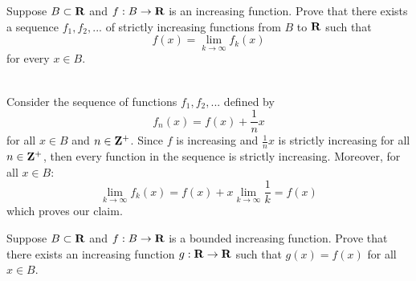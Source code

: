 \begin{exercise}
    Suppose $B \subset \mathbf{R}$ and $f : B \to \mathbf{R}$ is an increasing function. Prove that there exists a sequence $f_1, f_2, ...$ of strictly increasing functions from $B$ to $\mathbf{R}$ such that
    $$f(x) = \lim_{k \rightarrow \infty}f_k(x)$$
    for every $x \in B$.\\
\end{exercise}

\begin{solution}
    \\ Consider the sequence of functions $f_1, f_2, ...$ defined by
    $$f_n(x) = f(x) + \frac{1}{n}x$$
    for all $x \in B$ and $n \in \mathbf{Z}^+$. Since $f$ is increasing and $\frac{1}{n}x$ is strictly increasing for all $n \in \mathbf{Z}^+$, then every function in the sequence is strictly increasing. Moreover, for all $x \in B$:
    $$\lim_{k \rightarrow \infty}f_k(x) = f(x) + x\lim_{k \rightarrow \infty}\frac{1}{k} = f(x)$$
    which proves our claim.\\
\end{solution}

\begin{exercise}
    Suppose $B \subset \mathbf{R}$ and $f : B \to \mathbf{R}$ is a bounded increasing function. Prove that there exists an increasing function $g : \mathbf{R} \to \mathbf{R}$ such that $g(x) = f(x)$ for all $x \in B$. \\
\end{exercise}

